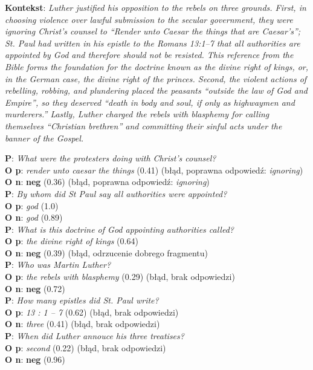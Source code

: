 \vspace{.3cm}

\noindent
\textbf{Kontekst}:
\textit{Luther justified his opposition to the rebels on three grounds. First, in choosing violence over lawful submission to the secular government, they were ignoring Christ's counsel to ``Render unto Caesar the things that are Caesar's''; St. Paul had written in his epistle to the Romans 13:1–7 that all authorities are appointed by God and therefore should not be resisted. This reference from the Bible forms the foundation for the doctrine known as the divine right of kings, or, in the German case, the divine right of the princes. Second, the violent actions of rebelling, robbing, and plundering placed the peasants ``outside the law of God and Empire'', so they deserved ``death in body and soul, if only as highwaymen and murderers.'' Lastly, Luther charged the rebels with blasphemy for calling themselves ``Christian brethren'' and committing their sinful acts under the banner of the Gospel.}

\noindent
\textbf{P}: \textit{What were the protesters doing with Christ's counsel?}\\
\textbf{O p}: \textit{render unto caesar the things} (0.41) (błąd, poprawna odpowiedź: \textit{ignoring})\\
\textbf{O n}: \textbf{neg} (0.36) (błąd, poprawna odpowiedź: \textit{ignoring})\\[5pt]
\textbf{P}: \textit{By whom did St Paul say all authorities were appointed?}\\
\textbf{O p}: \textit{god} (1.0)\\
\textbf{O n}: \textit{god} (0.89)\\[5pt]
\textbf{P}: \textit{What is this doctrine of God appointing authorities called?}\\
\textbf{O p}: \textit{the divine right of kings} (0.64)\\
\textbf{O n}: \textbf{neg} (0.39) (błąd, odrzucenie dobrego fragmentu)\\[10pt]
\textbf{P}: \textit{Who was Martin Luther?}\\
\textbf{O p}: \textit{the rebels with blasphemy} (0.29) (błąd, brak odpowiedzi)\\
\textbf{O n}: \textbf{neg} (0.72)\\[5pt]
\textbf{P}: \textit{How many epistles did St. Paul write?}\\
\textbf{O p}: \textit{13 : 1 – 7} (0.62) (błąd, brak odpowiedzi)\\
\textbf{O n}: \textit{three} (0.41) (błąd, brak odpowiedzi)\\[5pt]
\textbf{P}: \textit{When did Luther annouce his three treatises?}\\
\textbf{O p}: \textit{second} (0.22) (błąd, brak odpowiedzi)\\
\textbf{O n}: \textbf{neg} (0.96)

